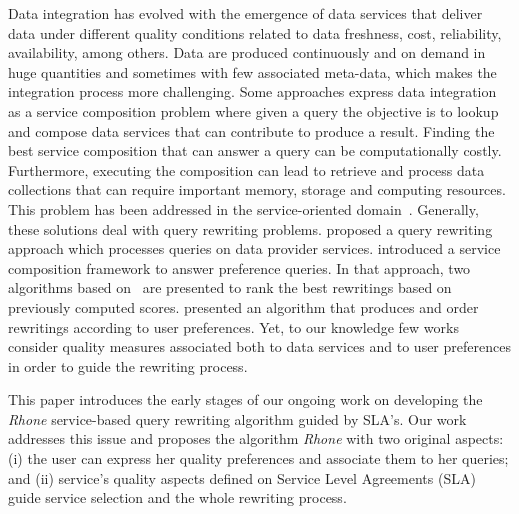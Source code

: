 Data integration has evolved with the emergence of data services that deliver
data under different quality conditions related to data freshness, cost, reliability,
availability, among others. Data are produced continuously and on demand in huge
quantities and sometimes with few associated meta-data, which makes the
integration process more challenging. Some approaches express data integration
as a service composition problem where given a query the objective is to lookup and compose data services that can contribute to produce a result. Finding the best service composition that can answer a query can be computationally costly. Furthermore,  executing the composition can lead to retrieve and process data collections that can require important memory, storage and computing resources.
This problem has been addressed in the service-oriented
domain~\cite{Barhamgi2010,Benouaret2011,ba2014}.
Generally, these solutions deal with query rewriting problems.
\cite{Barhamgi2010} proposed a query rewriting approach which processes queries
on data provider services. \cite{Benouaret2011} introduced a service composition
framework to answer preference queries. In that approach, two algorithms based
on~\cite{Barhamgi2010} are presented to rank the best rewritings based on previously computed scores.
\cite{ba2014} presented an algorithm that produces and order rewritings
according to user preferences. Yet, to our knowledge few works consider quality
measures associated both to data services and to user preferences in order to
guide the rewriting process. 


This paper introduces the early stages of our
ongoing work on developing the \textit{Rhone} service-based query rewriting
algorithm guided by SLA's. Our work addresses this issue and proposes the 
algorithm \textit{Rhone} with two original aspects: (i) the user can express
her quality preferences and associate them to her queries; and (ii)  service's
quality aspects defined on Service Level Agreements (SLA) guide service
selection and  the whole rewriting process.

